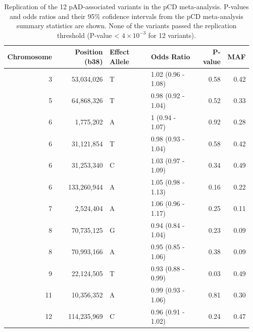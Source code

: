\begin{table}[H]
  \caption{Replication of the 12 pAD-associated variants in the pCD meta-analysis. P-values and odds ratios and their 95\% cofidence intervals from the pCD meta-analysis summary statistics are shown. None of the variants passed the replication threshold (P-value < $4\times10^{-3}$ for 12 variants).}
  \label{table:pcd_replication}
  \centering\begingroup\fontsize{10}{12}\selectfont
  
  \begin{tabular}[t]{|r|r|l|l|r|r|}
  \hline
  Chromosome & Position (b38) & Effect Allele & Odds Ratio & P-value & MAF\\
  \hline
  3 & 53,034,026 & T & 1.02 (0.96 - 1.08) & 0.58 & 0.42\\
  \hline
  5 & 64,868,326 & T & 0.98 (0.92 - 1.04) & 0.52 & 0.33\\
  \hline
  6 & 1,775,202 & A & 1 (0.94 - 1.07) & 0.92 & 0.28\\
  \hline
  6 & 31,121,854 & T & 0.98 (0.93 - 1.04) & 0.58 & 0.42\\
  \hline
  6 & 31,253,340 & C & 1.03 (0.97 - 1.09) & 0.34 & 0.49\\
  \hline
  6 & 133,260,944 & A & 1.05 (0.98 - 1.13) & 0.16 & 0.22\\
  \hline
  7 & 2,524,404 & A & 1.06 (0.96 - 1.17) & 0.25 & 0.11\\
  \hline
  8 & 70,735,125 & G & 0.94 (0.84 - 1.04) & 0.23 & 0.09\\
  \hline
  8 & 70,993,166 & A & 0.95 (0.85 - 1.06) & 0.38 & 0.09\\
  \hline
  9 & 22,124,505 & T & 0.93 (0.88 - 0.99) & 0.03 & 0.49\\
  \hline
  11 & 10,356,352 & A & 0.99 (0.93 - 1.06) & 0.81 & 0.30\\
  \hline
  12 & 114,235,969 & C & 0.96 (0.91 - 1.02) & 0.24 & 0.47\\
  \hline  
  \end{tabular}
  \endgroup{}
  \end{table}

